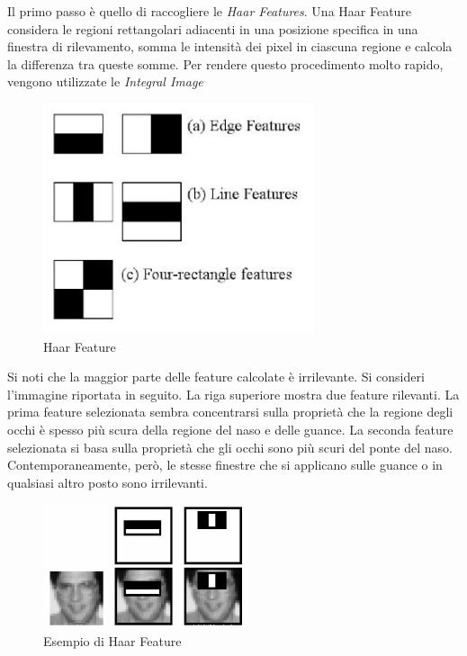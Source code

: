 Il primo passo è quello di raccogliere le \emph{Haar Features}. Una Haar Feature considera le regioni rettangolari adiacenti in una posizione specifica in una finestra di rilevamento, somma le intensità dei pixel in ciascuna regione e calcola la differenza tra queste somme. Per rendere questo procedimento molto rapido, vengono utilizzate le \emph{Integral Image}
\begin{figure}[h!]
	\centering
	\includegraphics[width=80mm]{img/4/violahaar_1_8}
	\caption{\fontsize{10px}{0mm}\selectfont Haar Feature \label{fig:violahaar_1_8}}
\end{figure}

Si noti che la maggior parte delle feature calcolate è irrilevante. Si consideri l'immagine riportata in seguito. La riga superiore mostra due feature rilevanti. La prima feature selezionata sembra concentrarsi sulla proprietà che la regione degli occhi è spesso più scura della regione del naso e delle guance. La seconda feature selezionata si basa sulla proprietà che gli occhi sono più scuri del ponte del naso. Contemporaneamente, però, le stesse finestre che si applicano sulle guance o in qualsiasi altro posto sono irrilevanti.

\begin{figure}[h!]
	\centering
	\includegraphics[width=60mm]{img/4/violahaar_1_9}
	\caption{\fontsize{10px}{0mm}\selectfont Esempio di Haar Feature \label{fig:violahaar_1_9}}
\end{figure} \newpage


